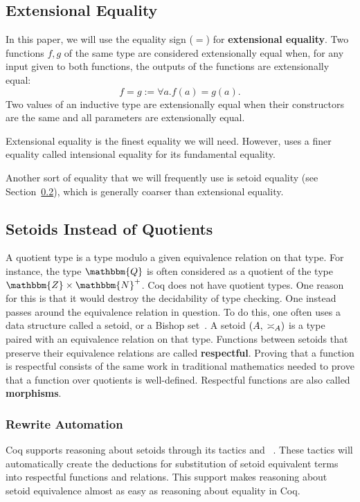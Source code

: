 \documentclass{elsarticle}
\newcommand{\assign}{:=}
\newcommand{\op}[1]{#1}
\newcommand{\tmdfn}[1]{\textbf{#1}}
\newcommand{\tmtexttt}[1]{{\ttfamily{#1}}}
\newcommand{\defEq}{\ensuremath{\assign}}
\newcommand{\coq}{\tmtexttt{Coq}}
\begin{document}
\subsection{Extensional Equality}In this paper, we will use the
equality sign ($\op{=}$) for {\tmdfn{extensional equality}}.
Two functions $f, g$ of the same type are considered extensionally equal when,
for any input given to both functions, the outputs of the functions are
extensionally equal:
\[ f = g \defEq \forall a. f (a) = g (a) . \]
Two values of an inductive type are extensionally equal when their
constructors are the same and all parameters are extensionally equal.

Extensional equality is the finest equality we will need. However, {\coq} uses
a finer equality called intensional equality for its fundamental equality.

Another sort of equality that we will frequently use is setoid equality (see
Section~\ref{setoid}), which is generally coarser than extensional equality.

\subsection{Setoids Instead of Quotients}\label{setoid}A quotient type is a
type modulo a given equivalence relation on that type. For instance, the type
$\mathbbm{Q}$ is often considered as a quotient of the type $\mathbbm{Z}
\times \mathbbm{N}^+$. Coq does not have quotient types. One reason for this
is that it would destroy the decidability of type checking. One instead passes
around the equivalence relation in question. To do this, one often uses a data
structure called a setoid, or a Bishop set~{\cite{Bishop67,Hofmann,Capretta}}.
A setoid $(A, {\nobreak} \op{\asymp_A})$ is a type paired with an equivalence
relation on that type. Functions between setoids that preserve their
equivalence relations are called {\tmdfn{respectful}}. Proving that a function
is respectful consists of the same work in traditional mathematics needed to
prove that a function over quotients is well-defined. Respectful functions are
also called {\tmdfn{morphisms}}.

\subsubsection{Rewrite Automation}\label{RewriteDatabase}Coq supports reasoning about setoids
through its tactics \tmtexttt{setoid\_rewrite} and
\tmtexttt{setoid\_replace}~{\cite{Coen:2004}}. These tactics will
automatically create the deductions for substitution of setoid equivalent
terms into respectful functions and relations. This support makes reasoning
about setoid equivalence almost as easy as reasoning about equality in Coq.
\end{document}

